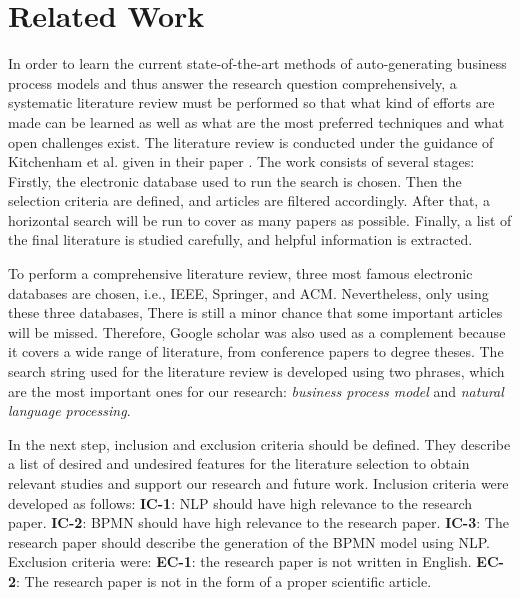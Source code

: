\chapter{Related Work}
\label{sec:rel}

	In order to learn the current state-of-the-art methods of auto-generating business process models and thus answer the research question comprehensively, a systematic literature review must be performed so that what kind of efforts are made can be learned as well as what are the most preferred techniques and what open challenges exist. The literature review is conducted under the guidance of Kitchenham et al. given in their paper \cite{literature_review_guidance}. The work consists of several stages: Firstly, the electronic database used to run the search is chosen. Then the selection criteria are defined, and articles are filtered accordingly. After that, a horizontal search will be run to cover as many papers as possible. Finally, a list of the final literature is studied carefully, and helpful information is extracted.
	
	To perform a comprehensive literature review, three most famous electronic databases are chosen, i.e., IEEE, Springer, and ACM. Nevertheless, only using these three databases, There is still a minor chance that some important articles will be missed. Therefore, Google scholar was also used as a complement because it covers a wide range of literature, from conference papers to degree theses. The search string used for the literature review is developed using two phrases, which are the most important ones for our research: \textit{business process model} and \textit{natural language processing}.
	
	In the next step, inclusion and exclusion criteria should be defined. They describe a list of desired and undesired features for the literature selection to obtain relevant studies and support our research and future work. Inclusion criteria were developed as follows: \textbf{IC-1}: NLP should have high relevance to the research paper. \textbf{IC-2}: BPMN should have high relevance to the research paper. \textbf{IC-3}: The research paper should describe the generation of the BPMN model using NLP. Exclusion criteria were: \textbf {EC-1}: the research paper is not written in English. \textbf{EC-2}: The research paper is not in the form of a proper scientific article. 
	
